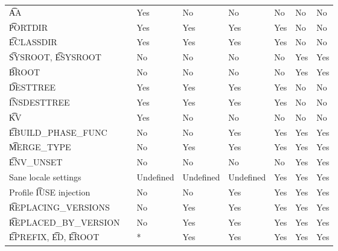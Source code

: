 \begin{landscape}
\begin{longtable}{llP{7.5em}P{7.5em}P{7.5em}P{7.5em}P{7.5em}P{7.5em}}
\t{AA} &  &
    Yes & No & No & No & No & No \\

\t{PORTDIR} &  &
    Yes & Yes & Yes & Yes & No & No \\

\t{ECLASSDIR} &  &
    Yes & Yes & Yes & Yes & No & No \\

\t{SYSROOT}, \t{ESYSROOT} &  &
    No & No & No & No & Yes & Yes \\

\t{BROOT} &  &
    No & No & No & No & Yes & Yes \\

\t{DESTTREE} &  &
    Yes & Yes & Yes & Yes & No & No \\

\t{INSDESTTREE} &  &
    Yes & Yes & Yes & Yes & No & No \\

\t{KV} &  &
    Yes & No & No & No & No & No \\

\t{EBUILD_PHASE_FUNC} &  &
    No & No & Yes & Yes & Yes & Yes \\

\t{MERGE_TYPE} &  &
    No & Yes & Yes & Yes & Yes & Yes \\

\t{ENV_UNSET} &  &
    No & No & No & No & Yes & Yes \\

Sane locale settings &  &
    Undefined & Undefined & Undefined & Yes & Yes & Yes \\

Profile \t{IUSE} injection &  &
    No & No & Yes & Yes & Yes & Yes \\

\t{REPLACING_VERSIONS} &  &
    No & Yes & Yes & Yes & Yes & Yes \\

\t{REPLACED_BY_VERSION} &  &
    No & Yes & Yes & Yes & Yes & Yes \\

\t{EPREFIX}, \t{ED}, \t{EROOT} &  &
    * & Yes & Yes & Yes & Yes & Yes \\


\end{longtable}
\end{landscape}
